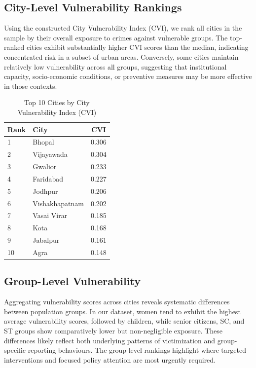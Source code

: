 \documentclass[conference]{IEEEtran}
\begin{document}
\subsection{City-Level Vulnerability Rankings}
Using the constructed City Vulnerability Index (CVI), we rank all cities in the sample by their overall exposure to crimes against vulnerable groups. The top-ranked cities exhibit substantially higher CVI scores than the median, indicating concentrated risk in a subset of urban areas. Conversely, some cities maintain relatively low vulnerability across all groups, suggesting that institutional capacity, socio-economic conditions, or preventive measures may be more effective in those contexts.

\begin{table}[htbp]
\caption{Top 10 Cities by City Vulnerability Index (CVI)}
\label{tab:top_cities_cvi}
\centering
\small
\begin{tabular}{l l c}
\toprule
\textbf{Rank} & \textbf{City} & \textbf{CVI} \\
\midrule
1  & Bhopal           & 0.306 \\
2  & Vijayawada       & 0.304 \\
3  & Gwalior          & 0.233 \\
4  & Faridabad        & 0.227 \\
5  & Jodhpur          & 0.206 \\
6  & Vishakhapatnam   & 0.202 \\
7  & Vasai Virar      & 0.185 \\
8  & Kota             & 0.168 \\
9  & Jabalpur         & 0.161 \\
10 & Agra             & 0.148 \\
\bottomrule
\end{tabular}
\end{table}

\subsection{Group-Level Vulnerability}
Aggregating vulnerability scores across cities reveals systematic differences between population groups. In our dataset, women tend to exhibit the highest average vulnerability scores, followed by children, while senior citizens, SC, and ST groups show comparatively lower but non-negligible exposure. These differences likely reflect both underlying patterns of victimization and group-specific reporting behaviours. The group-level rankings highlight where targeted interventions and focused policy attention are most urgently required.
\end{document}
